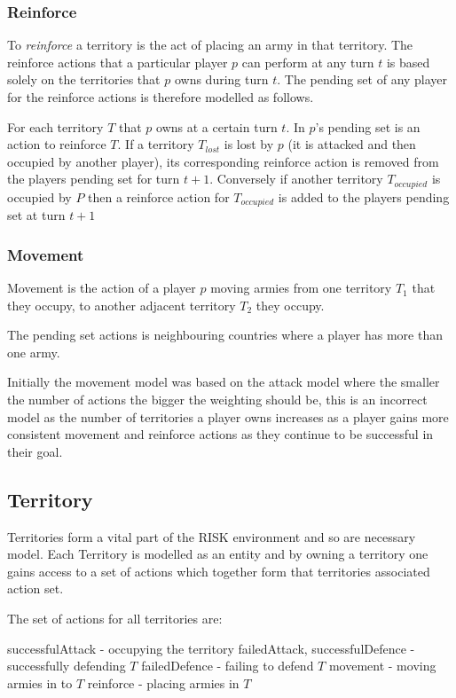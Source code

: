 \documentclass[parskip]{cs4rep}
\begin{document}
\subsubsection{Reinforce}

To \textit{reinforce} a territory is the act of placing an army in that territory. The reinforce actions that a particular player $p$ can perform at any turn $t$ is based solely on the territories that $p$ owns during turn $t$. The pending set of any player for the reinforce actions is therefore modelled as follows. 

For each territory $T$ that $p$ owns at a certain turn $t$. In $p$'s pending set is an action to reinforce $T$. If a territory $T_{lost}$ is lost by $p$ (it is attacked and then occupied by another player), its corresponding reinforce action is removed from the players pending set for turn $t+1$. Conversely if another territory $T_{occupied}$ is occupied by $P$ then a reinforce action for $T_{occupied}$ is added to the players pending set at turn $t+1$

\subsubsection{Movement}

Movement is the action of a player $p$ moving armies from one territory $T_{1}$ that they occupy, to another adjacent territory $T_{2}$ they occupy.

The pending set actions is neighbouring countries where a player has more than one army.

Initially the movement model was based on the attack model where the smaller the number of actions the bigger the weighting should be, this is an incorrect model as the number of territories a player owns increases as a player gains more consistent movement and reinforce actions as they continue to be successful in their goal.

\subsection{Territory}

Territories form a vital part of the RISK environment and so are necessary model. Each Territory is modelled as an entity and by owning a territory one gains access to a set of actions which together form that territories associated action set.

The set of actions for all territories are:

successfulAttack - occupying the territory failedAttack,
successfulDefence - successfully defending $T$
failedDefence - failing to defend $T$
movement - moving armies in to $T$
reinforce - placing armies in $T$
\end{document}
